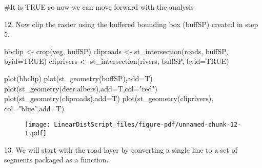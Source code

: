 \documentclass[
  letterpaper,
]{book}
\newenvironment{Shaded}{\begin{snugshade}}{\end{snugshade}}
\newcommand{\AttributeTok}[1]{\textcolor[rgb]{0.40,0.45,0.13}{#1}}
\newcommand{\CommentTok}[1]{\textcolor[rgb]{0.37,0.37,0.37}{#1}}
\newcommand{\ConstantTok}[1]{\textcolor[rgb]{0.56,0.35,0.01}{#1}}
\newcommand{\FunctionTok}[1]{\textcolor[rgb]{0.28,0.35,0.67}{#1}}
\newcommand{\NormalTok}[1]{\textcolor[rgb]{0.00,0.23,0.31}{#1}}
\newcommand{\OtherTok}[1]{\textcolor[rgb]{0.00,0.23,0.31}{#1}}
\newcommand{\StringTok}[1]{\textcolor[rgb]{0.13,0.47,0.30}{#1}}
\begin{document}
\begin{Shaded}
\begin{Highlighting}[]
\CommentTok{\#It is TRUE so now we can move forward with the analysis}
\end{Highlighting}
\end{Shaded}

12. Now clip the raster using the buffered bounding box (buffSP) created
in step 5.

\begin{Shaded}
\begin{Highlighting}[]
\NormalTok{bbclip }\OtherTok{\textless{}{-}} \FunctionTok{crop}\NormalTok{(veg, buffSP) }
\NormalTok{cliproads }\OtherTok{\textless{}{-}} \FunctionTok{st\_intersection}\NormalTok{(roads, buffSP, }\AttributeTok{byid=}\ConstantTok{TRUE}\NormalTok{)}
\NormalTok{cliprivers }\OtherTok{\textless{}{-}} \FunctionTok{st\_intersection}\NormalTok{(rivers, buffSP, }\AttributeTok{byid=}\ConstantTok{TRUE}\NormalTok{)}

\FunctionTok{plot}\NormalTok{(bbclip)}
\FunctionTok{plot}\NormalTok{(}\FunctionTok{st\_geometry}\NormalTok{(buffSP),}\AttributeTok{add=}\NormalTok{T)}
\FunctionTok{plot}\NormalTok{(}\FunctionTok{st\_geometry}\NormalTok{(deer.albers),}\AttributeTok{add=}\NormalTok{T,}\AttributeTok{col=}\StringTok{"red"}\NormalTok{)}
\FunctionTok{plot}\NormalTok{(}\FunctionTok{st\_geometry}\NormalTok{(cliproads),}\AttributeTok{add=}\NormalTok{T)}
\FunctionTok{plot}\NormalTok{(}\FunctionTok{st\_geometry}\NormalTok{(cliprivers), }\AttributeTok{col=}\StringTok{"blue"}\NormalTok{,}\AttributeTok{add=}\NormalTok{T)}
\end{Highlighting}
\end{Shaded}

\begin{figure}[H]

{\centering \texttt{[image: LinearDistScript\_files/figure-pdf/unnamed-chunk-12-1.pdf]}

}

\end{figure}

13. We will start with the road layer by converting a single line to a
set of segments packaged as a function.
\end{document}
